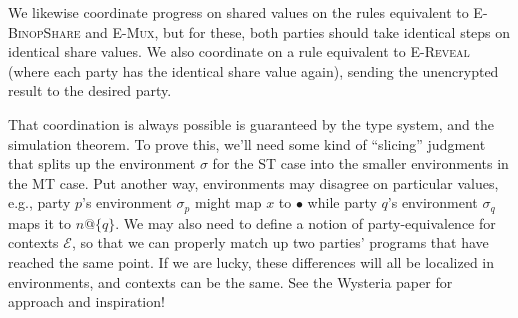 \documentclass[10pt]{article}
\makeatletter
\newcommand{\rulelab}[1]{{\small \textsc{#1}}}
\newcommand{\kw}[1]{\ensuremath{\mathtt{#1}}}
\newcommand{\ebinop}[2]{\ensuremath{{#1}~\oplus~{#2}}}
\newcommand{\ereveal}[4]{\ensuremath{\kw{reveal}^{#1}_{#4}~{#2}~{#3}}}
\newcommand{\eshare}[4]{\ensuremath{\kw{share}^{#2}_{#1}~{#3}~{#4}}}
\newcommand{\vshare}[3]{\ensuremath{\{{#3}\}^{#1}_{#2}}}
\newcommand{\vloc}[2]{\ensuremath{{#1}\kw{@}{#2}}}
\newcommand{\vcrash}{\ensuremath{\bullet}}
\newcommand{\env}{\ensuremath{\sigma}}
\newcommand{\ctxt}{\ensuremath{\mathcal{E}}}
\makeatother
\begin{document}
We likewise coordinate progress on shared values on the rules
equivalent to \rulelab{E-BinopShare} and \rulelab{E-Mux}, but for
these, both parties should take identical steps on identical share
values. We also coordinate on a rule equivalent to \rulelab{E-Reveal}
(where each party has the identical share value again), sending the
unencrypted result to the desired party.

That coordination is always possible is guaranteed by the type system,
and the simulation theorem. To prove this, we'll need some kind of
``slicing'' judgment that splits up the environment $\env$ for the ST
case into the smaller environments in the MT case. Put another way,
environments may disagree on particular values, e.g., party $p$'s
environment $\env_p$ might map $x$ to $\vcrash$ while party $q$'s
environment $\env_q$ maps it to $\vloc{n}{\{q\}}$. We may also need to
define a notion of party-equivalence for contexts $\ctxt$, so that we
can properly match up two parties' programs that have reached the same
point. If we are lucky, these differences will all be localized in
environments, and contexts can be the same. See the Wysteria paper for
approach and inspiration!

\end{document}
